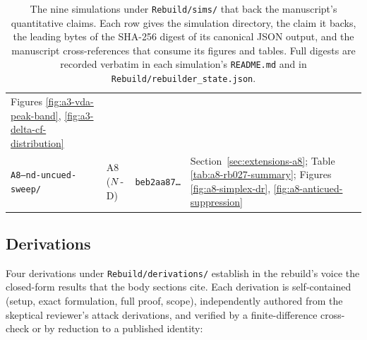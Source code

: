 \begin{table}[tb]
\begin{tabular}{@{}llp{2.6cm}p{6cm}@{}}
        Figures \ref{fig:a3-vda-peak-band}, \ref{fig:a3-delta-cf-distribution} \\
    \texttt{A8--nd-uncued-sweep/}
      & A8 ($N$-D)
      & \texttt{beb2aa87\ldots}
      & Section~\ref{sec:extensions-a8};
        Table \ref{tab:a8-rb027-summary};
        Figures \ref{fig:a8-simplex-dr}, \ref{fig:a8-anticued-suppression} \\
    \bottomrule
  \end{tabular}
  \caption[Wired simulations]{The nine simulations under
    \texttt{Rebuild/sims/} that back the manuscript's quantitative
    claims.  Each row gives the simulation directory, the claim it
    backs, the leading bytes of the SHA-256 digest of its canonical
    JSON output, and the manuscript cross-references that consume its
    figures and tables.  Full digests are recorded verbatim in each
    simulation's \texttt{README.md} and in
    \texttt{Rebuild/rebuilder\_state.json}.}
  \label{tab:methods-sims-summary}
\end{table}

\subsection{Derivations}
\label{sec:methods-derivations}

Four derivations under \texttt{Rebuild/derivations/} establish in the
rebuild's voice the closed-form results that the body sections cite.
Each derivation is self-contained (setup, exact formulation, full
proof, scope), independently authored from the skeptical reviewer's
attack derivations, and verified by a finite-difference cross-check
or by reduction to a published identity:

